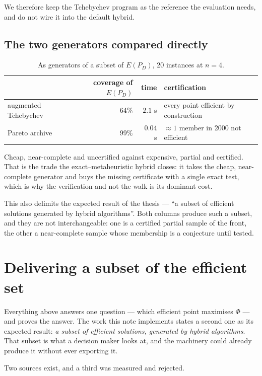 \documentclass[11pt,a4paper]{article}
\newcommand{\Dset}{D}
\newcommand{\E}{E(P_{\Dset})}
\begin{document}
We therefore keep the Tchebychev program as the reference the evaluation needs,
and do not wire it into the default hybrid.

\subsection{The two generators compared directly}

\begin{table}[h]
\centering
\caption{As generators of a subset of $\E$, 20 instances at $n = 4$.}
\begin{tabular}{lrrl}
\toprule
 & coverage of $\E$ & time & certification \\
\midrule
augmented Tchebychev & 64\% & $2.1$ s  & every point efficient by construction \\
Pareto archive       & 99\% & $0.04$ s & $\approx 1$ member in 2000 not efficient \\
\bottomrule
\end{tabular}
\end{table}

\noindent
Cheap, near-complete and uncertified against expensive, partial and certified.
That is the trade the exact--metaheuristic hybrid closes: it takes the cheap,
near-complete generator and buys the missing certificate with a single exact
test, which is why the verification and not the walk is its dominant cost.

This also delimits the expected result of the thesis --- ``a subset of
efficient solutions generated by hybrid algorithms''. Both columns produce such
a subset, and they are not interchangeable: one is a certified partial sample
of the front, the other a near-complete sample whose membership is a
conjecture until tested.

\section{Delivering a subset of the efficient set}
\label{sec:subset}

Everything above answers one question --- which efficient point maximises
$\Phi$ --- and proves the answer.  The work this note implements states a
second one as its expected result: \emph{a subset of efficient solutions,
generated by hybrid algorithms}.  That subset is what a decision maker looks
at, and the machinery could already produce it without ever exporting it.

Two sources exist, and a third was measured and rejected.
\end{document}
